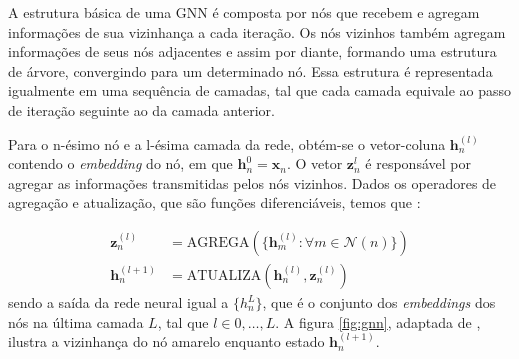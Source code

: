 A estrutura básica de uma GNN é composta por nós que recebem e agregam
informações de sua vizinhança a cada iteração. Os nós vizinhos também agregam
informações de seus nós adjacentes e assim por diante, formando uma estrutura de
árvore, convergindo para um determinado nó. Essa estrutura é representada
igualmente em uma sequência de camadas, tal que cada camada equivale ao passo de
iteração seguinte ao da camada anterior.

Para o n-ésimo nó e a l-ésima camada da rede, obtém-se o vetor-coluna
$\mathbf{h}^{(l)}_n$ contendo o \textit{embedding} do nó, em que
$\mathbf{h}^{0}_n = \mathbf{x}_n$. O vetor $\mathbf{z}^{l}_n$ é responsável
por agregar as informações transmitidas pelos nós vizinhos. Dados os operadores
de agregação e atualização, que são funções diferenciáveis, temos que \cite{Bishop:DeepLearning24}:

\begin{align}
    \mathbf{z}^{(l)}_n &= \text{AGREGA}( \{ \mathbf{h}^{(l)}_m : \forall m \in \mathcal{N}(n)\} ) \label{eq:agrega} \\
    \mathbf{h}^{(l+1)}_n &= \text{ATUALIZA}(\mathbf{h}^{(l)}_n, \mathbf{z}^{(l)}_n) \label{eq:atualiza}
\end{align}
sendo a saída da rede neural igual a $\{h^{L}_n\}$, que é o conjunto dos
\textit{embeddings} dos nós na última camada $L$, tal que $l \in {0, \ldots,
L}$. A figura \ref{fig:gnn}, adaptada de \citet{graph_rep_learning}, ilustra
a vizinhança do nó amarelo enquanto estado $\mathbf{h}^{(l+1)}_n$.

